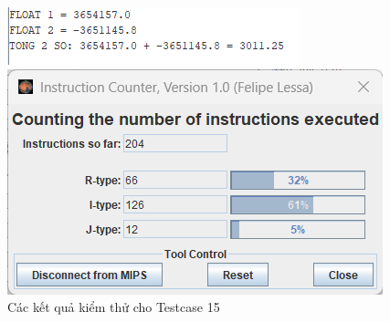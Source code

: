 \begin{figure}[!h]
    \centering
    \begin{minipage}[b]{0.48\textwidth}
        \centering
        \includegraphics[width=\textwidth]{image/TESTCASE/Testcase 15.png}
    \end{minipage}
    \hfill
    \begin{minipage}[b]{0.48\textwidth}
        \centering
        \includegraphics[width=\textwidth]{image/TESTCASE/Instruction Counter 15.png}
    \end{minipage}
    \vspace{0.5cm}
    \caption{Các kết quả kiểm thử cho Testcase 15}
\end{figure}


\newpage
